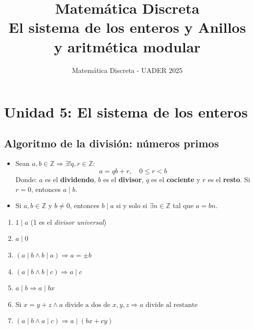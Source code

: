 \documentclass[12pt]{article}
\title{Matemática Discreta \\[0.5em]
\large El sistema de los enteros y Anillos y aritmética modular}
\author{Matemática Discreta - UADER 2025}
\date{}
\begin{document}
\maketitle
\tableofcontents
\bigskip
\newpage


\section{Unidad 5: El sistema de los enteros}

\subsection*{Algoritmo de la división: números primos}

\begin{tcolorbox}[title=Algoritmo de la división]
    \begin{itemize}
        \item Sean \( a, b \in \mathbb{Z} \Rightarrow \exists ! q, r \in \mathbb{Z} : \)
            \[ a = qb + r, \quad 0 \leq r < b \] 
            Donde: \( a \) es el \textbf{dividendo}, \( b \) es el \textbf{divisor}, \( q \) es el \textbf{cociente} y \( r \) es el \textbf{resto}. Si \( r = 0 \), entonces \( a \mid b \).
        \item Si \( a, b \in \mathbb{Z} \) y \( b \neq 0 \), entonces \( b \mid a \) si y solo si \( \exists n \in \mathbb{Z} \) tal que \( a = bn \).
    \end{itemize}
\end{tcolorbox}

\begin{tcolorbox}[title=Propiedades de la relacion de divisibilidad]
\begin{enumerate}
    \item \( 1 \mid a \) (1 es el \textit{divisor universal})
    \item \( a \mid 0 \)
    \item \( (a \mid b \land b \mid a) \Rightarrow a = \pm b \)
    \item \( (a \mid b \land b \mid c) \Rightarrow a \mid c \)
    \item \( a \mid b \Rightarrow a \mid bx \)
    \item Si \( x = y + z \land a \text{ divide a dos de } x, y, z \Rightarrow a \text{ divide al restante} \) 
    \item \( (a \mid b \land a \mid c) \Rightarrow a \mid (bx + cy) \)
\end{enumerate}
\end{tcolorbox}
\end{document}
